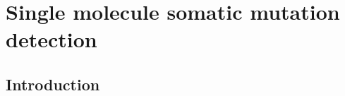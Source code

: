 
\chapter{Single molecule somatic mutation detection}

\ifpdf
    \graphicspath{{Chapter2/Figs/Raster/}{Chapter2/Figs/PDF/}{Chapter2/Figs/}}
\else
    \graphicspath{{Chapter2/Figs/Vector/}{Chapter2/Figs/}}
\fi





\section{Introduction}

